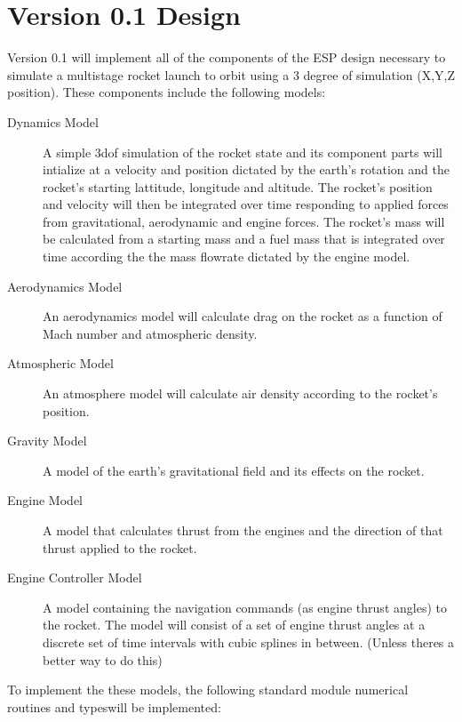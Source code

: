 \documentclass{book}
\begin{document}
\section{Version 0.1 Design}
Version 0.1 will implement all of the components of the ESP design necessary to simulate a multistage rocket launch to orbit using a 3 degree of simulation (X,Y,Z position). These components include the following models:
\begin{description}
	\item[Dynamics Model] A simple 3dof simulation of the rocket state and its component parts will intialize at a velocity  and position dictated by the earth's rotation and the rocket's starting lattitude, longitude and altitude. The rocket's position and velocity will then be integrated over time responding to applied forces from gravitational, aerodynamic and engine forces. The rocket's mass will be calculated from a starting mass and a fuel mass that is integrated over time according the the mass flowrate dictated by the engine model.
	\item[Aerodynamics Model] An aerodynamics model will calculate drag on the rocket as a function of Mach number and atmospheric density.
	\item[Atmospheric Model] An atmosphere model will calculate air density according to the rocket's position.
	\item[Gravity Model] A model of the earth's gravitational field and its effects on the rocket.
	\item[Engine Model] A model that calculates thrust from the engines and the direction of that thrust applied to the rocket.
	\item[Engine Controller Model] A model containing the navigation commands (as engine thrust angles) to the rocket. The model will  consist of a set of engine thrust angles at a discrete set of time intervals with cubic splines in between. (Unless theres a better way to do this)
\end{description}
To implement the these models, the following standard module numerical routines and typeswill be implemented:
\end{document}
